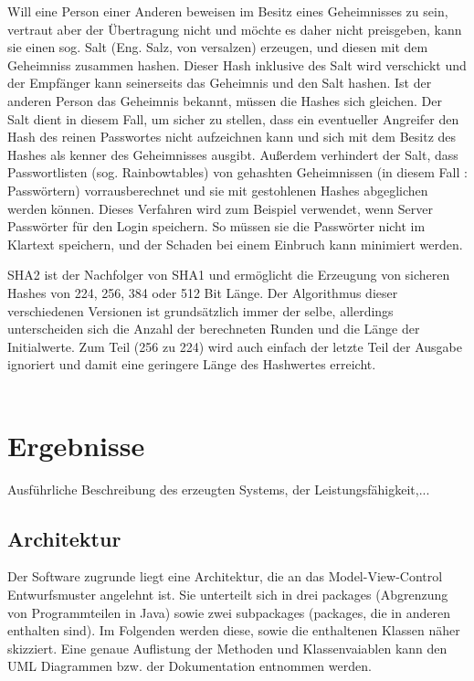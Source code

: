 \documentclass[12pt,a4paper,bibliography=totocnumbered,listof=totocnumbered]{scrartcl}
\begin{document}
Will eine Person einer Anderen beweisen im Besitz eines Geheimnisses zu sein, vertraut aber der Übertragung nicht und möchte es daher nicht preisgeben, kann sie einen sog. Salt (Eng. Salz, von versalzen) erzeugen, und diesen mit dem Geheimniss zusammen hashen. Dieser Hash inklusive des Salt wird verschickt und der Empfänger kann seinerseits das Geheimnis und den Salt hashen. Ist der anderen Person das Geheimnis bekannt, müssen die Hashes sich gleichen. Der Salt dient in diesem Fall, um sicher zu stellen, dass ein eventueller Angreifer den Hash des reinen Passwortes nicht aufzeichnen kann und sich mit dem Besitz des Hashes als kenner des Geheimnisses ausgibt. Außerdem verhindert der Salt, dass Passwortlisten (sog. Rainbowtables) von gehashten Geheimnissen (in diesem Fall : Passwörtern) vorrausberechnet und sie mit gestohlenen Hashes abgeglichen werden können. Dieses Verfahren wird zum Beispiel verwendet, wenn Server Passwörter für den Login speichern. So müssen sie die Passwörter nicht im Klartext speichern, und der Schaden bei einem Einbruch kann minimiert werden. 

SHA2 ist der Nachfolger von SHA1 und ermöglicht die Erzeugung von sicheren Hashes von 224, 256, 384 oder 512 Bit Länge. Der Algorithmus dieser verschiedenen Versionen ist grundsätzlich immer der selbe, allerdings unterscheiden sich die Anzahl der berechneten Runden und die Länge der Initialwerte. Zum Teil (256 zu 224) wird auch einfach der letzte Teil der Ausgabe ignoriert und damit eine geringere Länge des Hashwertes erreicht.
\\\cite{8}\cite{9}\cite{10}\\
\pagebreak



\section{Ergebnisse}
Ausführliche Beschreibung des erzeugten Systems, der Leistungsfähigkeit,...
\subsection{Architektur}
Der Software zugrunde liegt eine Architektur, die an das Model-View-Control Entwurfsmuster angelehnt ist. Sie unterteilt sich in drei packages (Abgrenzung von Programmteilen in Java) sowie zwei subpackages (packages, die in anderen enthalten sind). Im Folgenden werden diese, sowie die enthaltenen Klassen näher skizziert. Eine genaue Auflistung der Methoden und Klassenvaiablen kann den UML Diagrammen bzw. der Dokumentation entnommen werden.
\end{document}
